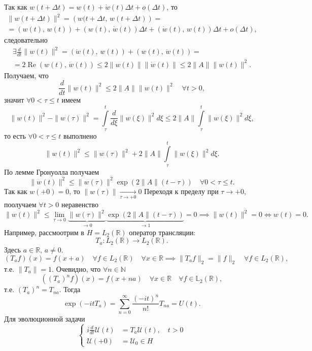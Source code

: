 Так как $w(t+\Delta t)= w(t) + \dot{w} (t) \Delta t +o(\Delta t)$, то
\begin{multline*}
	\| w(t+\Delta t)\|^2 =\left( w(t+\Delta t,\, w (t+\Delta t) \right) =\\=\left( w(t),\,w(t) \right) +
	\left( w(t),\, \dot{w}(t) \right) \Delta t+
	\left( \dot{w}(t),\, w(t) \right) \Delta t+ o(\Delta t)
 ,\end{multline*}
следовательно
\begin{multline*}
	\exists \frac{d}{dt} \| w(t)\|^2 =\left( \dot{w}(t),\,
	w(t)\right) +\left( w(t),\,\dot{w}(t) \right) =\\=
	2 \operatorname{Re} \left( w(t),\,\dot{w}(t) \right) \le 
	2\| w(t)\|\left\lVert \dot{w}(t)\right\rVert\le 
	2 \| A\|\| w(t)\|^2
.\end{multline*} 
Получаем, что
\[
	\frac{d}{dt} \| w(t)\|^2\le 2 \| A\|\| w(t)\|^2 \quad
	\forall t>0
,\] 
значит $\forall 0 <\tau \le  t$ имеем
\[
	\| w(t)\|^2-\| w(\tau)\|^2=
	\int\limits_{\tau}^{t} \frac{d}{d\xi}\| w(\xi)\|^2 d\xi
	\le 2 \| A\| \int\limits_{\tau}^{t} \| w(\xi)\|^2 d\xi, 
\]
то есть $\forall 0 < \tau \le t$ выполнено
\[
	\| w(t)\|^2 \le \| w(\tau)\|^2+ 2\| A\|\int\limits_{\tau}^{t} 
	\| w(\xi)\|^2 d\xi.
\] 
По лемме Гронуолла получаем
\[
	\| w(t)\|^2\le \| w(\tau)\|^2 \exp \left( 2 \| A\|(t-\tau) \right) \quad \forall 0 < \tau \le t
.\] 
Так как $w(+0)=0$, то  $\| w(\tau)\|\xrightarrow[\tau\to +0]{} 0$ 
Переходя к пределу при $\tau\to +0$, поолучаем $\forall t>0$
неравенство
\[
	\| w(t)\|^2 \le \lim_{\tau \to 0} \underbrace{\| w(\tau)\|^2}_{\to 0} \underbrace{\exp\left( 2 \| A\|(t-\tau) \right)}_{\to 1}=0
	\implies \| w(t)\|^2=0 \Leftrightarrow w(t) =0
.\] 
Например, рассмоотрим в $H=L_2(\mathbb{R})$ оператор трансляции:
\[
	T_a: L_2(\mathbb{R})\to L_2 (\mathbb{R})
.\] 
Здесь $a \in \mathbb{R}, \, a \neq 0$.
\[
	(T_a f)(x) =f(x+a) \quad \forall f \in  L_2(\mathbb{R})
	\quad \forall x \in \mathbb{R}\implies
	\| T_a f\|_2=\| f\|_2 \quad \forall f \in L_2(\mathbb{R})
 ,\]
 т.\:е. $\| T_a\|=1$. Очевидно, что $\forall n \in \mathbb{N}$ 
 \[
	 \left( (T_a)^n f \right) (x) =f(x+na) \quad \forall x \in 
	 \mathbb{R} \quad \forall f \in \mathbb{L}_2(\mathbb{R})
  ,\]
  т.\:е. $(T_a)^n=T_{na}$. Тогда
 \[
	 \exp (-i t T_a)= \sum_{n=0}^{\infty} \frac{(-it)^n}{n!}T_{na}=U(t)
 .\]
 Для эволюционной задачи
 \[
 \left\{
 \begin{aligned}
	 i \frac{d}{dt} \mathcal{U}(t)&= T_a \mathcal{U}(t), \quad
	 t> 0\\
	 \mathcal{U}(+0)&=\mathcal{U}_0 \in H
 \end{aligned}
 \right.
 \]
